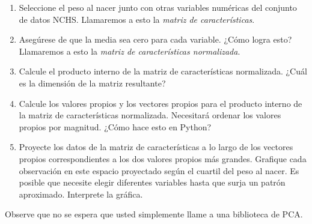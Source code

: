 \begin{enumerate}
	\item Seleccione el peso al nacer junto con otras variables numéricas del conjunto de datos NCHS. Llamaremos a esto la \textit{matriz de características}.
	\item Asegúrese de que la media sea cero para cada variable. ¿Cómo logra esto? \QA Llamaremos a esto la \textit{matriz de características normalizada}.
	\item Calcule el producto interno de la matriz de características normalizada. ¿Cuál es la dimensión de la matriz resultante? \QA
	\item Calcule los valores propios y los vectores propios para el producto interno de la matriz de características normalizada. Necesitará ordenar los valores propios por magnitud. ¿Cómo hace esto en Python? \QA
	\item Proyecte los datos de la matriz de características a lo largo de los vectores propios correspondientes a los dos valores propios más grandes. Grafique cada observación en este espacio proyectado según el cuartil del peso al nacer. Es posible que necesite elegir diferentes variables hasta que surja un patrón aproximado. Interprete la gráfica. \QA
\end{enumerate}

Observe que no se espera que usted simplemente llame a una biblioteca de PCA.

%
%

